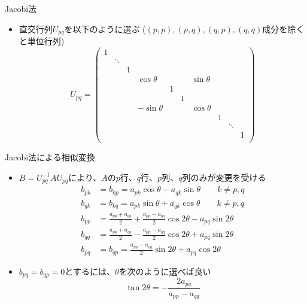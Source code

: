 \documentclass[dvipdfmx]{beamer}
\begin{document}
\begin{frame}[t,fragile]{Jacobi法}
  \begin{itemize}
    \setlength{\itemsep}{1em}
  \item 直交行列$U_{pq}$を以下のように選ぶ ($(p,p),(p,q),(q,p),(q,q)$成分を除くと単位行列)
    \[
    U_{pq} =
    \begin{pmatrix}
      1 \\
      & \ddots \\
      & & 1 \\
      & & & \cos \theta & & & \sin \theta \\
      & & & & 1 \\
      & & & & & 1 \\
      & & & -\sin \theta & & & \cos \theta \\
      & & & & & & & 1 \\
      & & & & & & & & \ddots \\
      & & & & & & & & & 1 \\
    \end{pmatrix}
    \]
  \end{itemize}
\end{frame}

\begin{frame}[t,fragile]{Jacobi法による相似変換}
  \begin{itemize}
    \setlength{\itemsep}{1em}
  \item $B=U_{pq}^{-1} A U_{pq}$により、$A$の$p$行、$q$行、$p$列、$q$列のみが変更を受ける
    \begin{align*}
      b_{pk} &= b_{kp} = a_{pk} \cos \theta - a_{qk} \sin \theta \qquad k \ne p,q \\
      b_{qk} &= b_{kq} = a_{pk} \sin \theta + a_{qk} \cos \theta \qquad k \ne p,q \\
      b_{pp} &= \frac{a_{pp}+a_{qq}}{2} + \frac{a_{pp}-a_{qq}}{2} \cos 2 \theta - a_{pq} \sin 2 \theta \\
      b_{qq} &= \frac{a_{pp}+a_{qq}}{2} - \frac{a_{pp}-a_{qq}}{2} \cos 2 \theta + a_{pq} \sin 2 \theta \\
      b_{pq} &= b_{qp} = \frac{a_{pp}-a_{qq}}{2} \sin 2 \theta + a_{pq} \cos 2 \theta
    \end{align*}
  \item $b_{pq} = b_{qp} = 0$とするには、$\theta$を次のように選べば良い
    \[
    \tan 2 \theta = - \frac{2 a_{pq}}{a_{pp}-a_{qq}}
    \]
  \end{itemize}
\end{frame}
\end{document}
